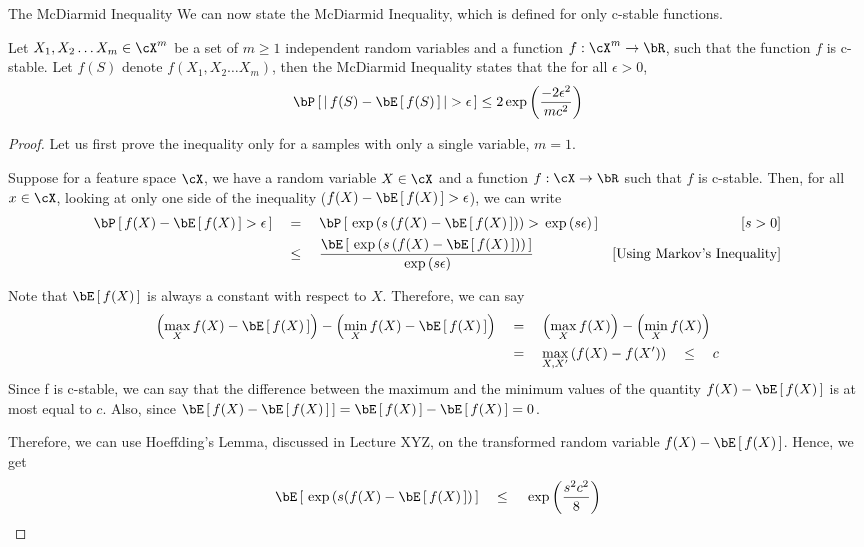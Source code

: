 \documentclass{article}
\begin{document}
\begin{ssection}{The McDiarmid Inequality}
	We can now state the McDiarmid Inequality, which is defined for only c-stable functions. \br
	
	\begin{theorem}
		Let $X_1, X_2 \dots X_m \in \cX^m$ be a set of $m \ge 1$ independent random variables and a function $f : \cX^m \ra \bR$, such that the function $f$ is c-stable. Let $f(S)$ denote $f(X_1, X_2 \dots X_m)$, then the McDiarmid Inequality states that the for all $\epsilon > 0$,
		\begin{equation}
			\prob{\abs{f(S) - \E{f(S)}} > \epsilon}	\le 2 \texp{\frac{-2 \epsilon^2}{m c^2}}
			\label{eq:mcdiarmid}
		\end{equation}
		\label{def:mcdiarmid}
	\end{theorem}
	
	\begin{proof}
		Let us first prove the inequality only for a samples with only a single variable, \ie $m  = 1$.
		
		Suppose for a feature space $\cX$, we have a random variable $X \in \cX$ and a function $f : \cX \ra \bR$ such that $f$ is c-stable. Then, for all $x \in \cX$, looking at only one side of the inequality (\ie $f(X) - \E{f(X)} > \epsilon$), we can write
		\begin{align*}
			\prob{f(X) - \E{f(X)} > \epsilon} & \eq	\prob{\texp{s \para{f(X) - \E{f(X)}}} > \texp{s \epsilon}}	\mcmnt{$s > 0$}                       \\
			                                  & \qle	\frac{\E{\texp{s \para{f(X) - \E{f(X)}}}}}{\texp{s \epsilon}} \mcmnt{Using Markov's Inequality} 
		\end{align*}
		
		Note that $\E{f(X)}$ is always a constant with respect to $X$. Therefore, we can say
		\begin{align*}
			\para{\max_{X} f(X) - \E{f(X)}} - \para{\min_{X} f(X) - \E{f(X)}} & \eq	\para{\max_{X} f(X)} - \para{\min_{X} f(X)} \\
			                                                                  & \eq	\max_{X, X'} \para{f(X) - f(X')} \qle c     
		\end{align*}
		Since f is c-stable, we can say that the difference between the maximum and the minimum values of the quantity $f(X) - \E{f(X)}$ is at most equal to $c$. Also, since $\E{f(X) - \E{f(X)}} = \E{f(X)} - \E{f(X)} = 0$.
		
		Therefore, we can use Hoeffding's Lemma, discussed in Lecture XYZ, on the transformed random variable $f(X) - \E{f(X)}$. Hence, we get
		\begin{align*}
			\E{\texp{s(f(X) - \E{f(X)}}}	\qle	\texp{\frac{s^2 c^2}{8}} 
		\end{align*}
		

\end{proof}
\end{ssection}
\end{document}
